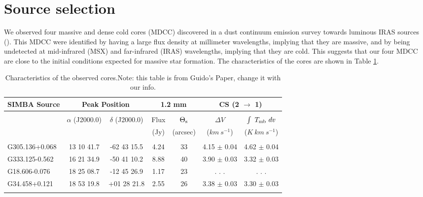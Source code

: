 


\section{Source selection}
We observed four massive and dense cold cores (MDCC) discovered in a dust continuum emission survey towards luminous IRAS sources (\cite{2004ApJ...610..313G}). This MDCC were identified by having a large flux density at millimeter wavelengths, implying that they are massive, and by being undetected at mid-infrared (MSX) and far-infrared (IRAS) wavelengths, implying that they are cold. This suggests that our four MDCC are close to the initial conditions expected for massive star formation. The characteristics of the cores are shown in Table \ref{targets}.

\begin{table}[!ht]
\centering
\footnotesize
\caption{Characteristics of the observed cores.Note: this table is from Guido's Paper, change it with our info.}
\label{targets}
\begin{tabular}{l c c  c c  c c}
\\
\hline
SIMBA Source & \multicolumn{2}{c}{Peak Position} & \multicolumn{2}{c}{1.2 mm} & \multicolumn{2}{c}{CS (2 $\rightarrow$ 1)} \\
\hline \\
& $\alpha$ (J2000.0) & $\delta$ (J2000.0) & Flux & $\Theta_{\rm s}$ & $\Delta V$ & $\int~ T_{\rm mb}~ dv$ \\
& & & (Jy) & (arcsec) & ($km~ s^{-1}$) & ($K~ km~ s^{-1}$) \\
\hline \\
G305.136+0.068 & 13 10 41.7 & -62 43 15.5 & 4.24 & 33 & 4.15 $\pm$ 0.04 & 4.62 $\pm$ 0.04 \\
G333.125-0.562 & 16 21 34.9 & -50 41 10.2 & 8.88 & 40 & 3.90 $\pm$ 0.03 & 3.32 $\pm$ 0.03 \\
G18.606-0.076  & 18 25 08.7 & -12 45 26.9 & 1.17 & 23 &   . . . & . . . \\
G34.458+0.121  & 18 53 19.8 & +01 28 21.8 & 2.55 & 26 & 3.38 $\pm$ 0.03 & 3.30 $\pm$ 0.03 \\
\hline \\
\end{tabular}
\end{table}

